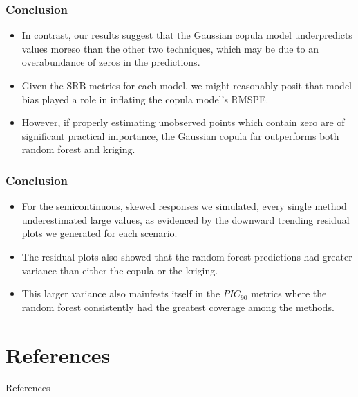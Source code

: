 \documentclass{beamer}
\begin{document}
\begin{frame}
	\frametitle{Conclusion}
	\begin{itemize}
	\item In contrast, our results suggest that the Gaussian copula model underpredicts values moreso than the other two techniques, which may be due to an overabundance of zeros in the predictions.
	\item Given the SRB metrics for each model, we might reasonably posit that model bias played a role in inflating the copula model's RMSPE.
	\item However, if properly estimating unobserved points which contain zero are of significant practical importance, the Gaussian copula far outperforms both random forest and kriging.
	\end{itemize}
\end{frame}

\begin{frame}
	\frametitle{Conclusion}
	\begin{itemize}
	\item For the semicontinuous, skewed responses we simulated, every single method underestimated large values, as evidenced by the downward trending residual plots we generated for each scenario.
	\item The residual plots also showed that the random forest predictions had greater variance than either the copula or the kriging.
	\item This larger variance also mainfests itself in the $PIC_{90}$ metrics where the random forest consistently had the greatest coverage among the methods.
	\end{itemize}
\end{frame}

\section{References}
\begin{frame}{References}
\printbibliography
\end{frame}
\end{document}
